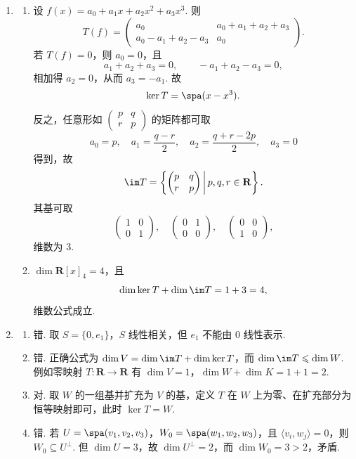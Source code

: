 \begin{enumerate}
    \item
    \begin{enumerate}
        \item 设 $f(x)=a_0+a_1x+a_2x^2+a_3x^3$. 则
        \[
            T(f)=\begin{pmatrix}
                a_0&a_0+a_1+a_2+a_3\\
                a_0-a_1+a_2-a_3&a_0
            \end{pmatrix}.
        \]
        若 $T(f)=0$，则 $a_0=0$，且
        \[
            a_1+a_2+a_3=0,\qquad -a_1+a_2-a_3=0,
        \]
        相加得 $a_2=0$，从而 $a_3=-a_1$. 故
        \[
            \ker T=\spa(x-x^3).
        \]
        反之，任意形如 $\begin{pmatrix}p&q\\r&p\end{pmatrix}$ 的矩阵都可取
        \[
            a_0=p,\quad a_1=\frac{q-r}{2},\quad a_2=\frac{q+r-2p}{2},\quad a_3=0
        \]
        得到，故
        \[
            \im T=\left\{\begin{pmatrix}p&q\\r&p\end{pmatrix}\,\middle|\,p,q,r\in\mathbf{R}\right\}.
        \]
        其基可取
        \[
            \begin{pmatrix}1&0\\0&1\end{pmatrix},\quad
            \begin{pmatrix}0&1\\0&0\end{pmatrix},\quad
            \begin{pmatrix}0&0\\1&0\end{pmatrix},
        \]
        维数为 $3$.

        \item $\dim\mathbf{R}[x]_4=4$，且
        \[
            \dim\ker T+\dim\im T=1+3=4,
        \]
        维数公式成立.
    \end{enumerate}

    \item
    \begin{enumerate}
        \item 错. 取 $S=\{0,e_1\}$，$S$ 线性相关，但 $e_1$ 不能由 $0$ 线性表示.

        \item 错. 正确公式为 $\dim V=\dim\im T+\dim\ker T$，而 $\dim\im T\leqslant\dim W$. 例如零映射 $T:\mathbf{R}\to\mathbf{R}$ 有 $\dim V=1$，$\dim W+\dim K=1+1=2$.

        \item 对. 取 $W$ 的一组基并扩充为 $V$ 的基，定义 $T$ 在 $W$ 上为零、在扩充部分为恒等映射即可，此时 $\ker T=W$.

        \item 错. 若 $U=\spa(v_1,v_2,v_3)$，$W_0=\spa(w_1,w_2,w_3)$，且 $\langle v_i,w_j\rangle=0$，则 $W_0\subseteq U^{\perp}$. 但 $\dim U=3$，故 $\dim U^{\perp}=2$，而 $\dim W_0=3>2$，矛盾.
    \end{enumerate}
\end{enumerate}

\clearpage
